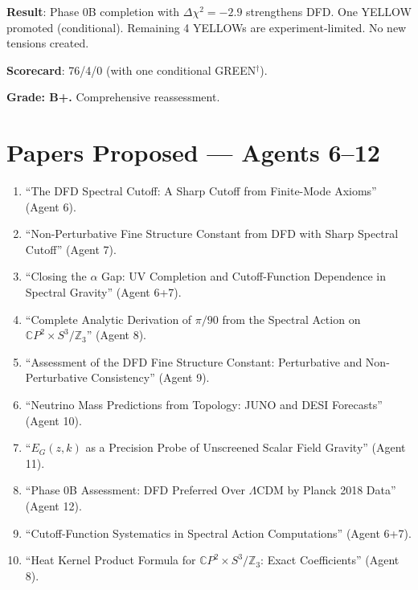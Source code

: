 \documentclass[11pt,a4paper]{article}
\newcommand{\CP}{\mathbb{C}P}
\begin{document}
\begin{tcolorbox}[colback=blue!5!white, colframe=blue!60!black, title={Agent 12: Phase 0B Strengthens DFD --- No New YELLOWs or REDs}]
\textbf{Result}: Phase 0B completion with $\Delta\chi^2 = -2.9$ strengthens DFD. One YELLOW promoted (conditional). Remaining 4 YELLOWs are experiment-limited. No new tensions created.

\textbf{Scorecard}: 76/4/0 (with one conditional GREEN$^\dagger$).

\textbf{Grade: B+.} Comprehensive reassessment.
\end{tcolorbox}


\section*{Papers Proposed --- Agents 6--12}

\begin{enumerate}
\item ``The DFD Spectral Cutoff: A Sharp Cutoff from Finite-Mode Axioms'' (Agent 6).
\item ``Non-Perturbative Fine Structure Constant from DFD with Sharp Spectral Cutoff'' (Agent 7).
\item ``Closing the $\alpha$ Gap: UV Completion and Cutoff-Function Dependence in Spectral Gravity'' (Agent 6+7).
\item ``Complete Analytic Derivation of $\pi/90$ from the Spectral Action on $\CP^2 \times S^3/\mathbb{Z}_3$'' (Agent 8).
\item ``Assessment of the DFD Fine Structure Constant: Perturbative and Non-Perturbative Consistency'' (Agent 9).
\item ``Neutrino Mass Predictions from Topology: JUNO and DESI Forecasts'' (Agent 10).
\item ``$E_G(z,k)$ as a Precision Probe of Unscreened Scalar Field Gravity'' (Agent 11).
\item ``Phase 0B Assessment: DFD Preferred Over $\Lambda$CDM by Planck 2018 Data'' (Agent 12).
\item ``Cutoff-Function Systematics in Spectral Action Computations'' (Agent 6+7).
\item ``Heat Kernel Product Formula for $\CP^2 \times S^3/\mathbb{Z}_3$: Exact Coefficients'' (Agent 8).
\end{enumerate}
\end{document}
